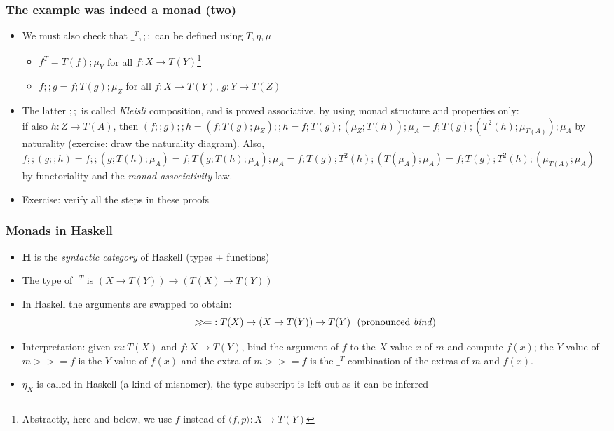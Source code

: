 \documentclass[handout]{beamer}
\newcommand{\bfsf}[1]{{\boldsymbol{#1}}}
\newcommand{\HH}{\bfsf{H}}
\newcommand{\Kp}[1]{{\langle #1 \rangle}}
\newcommand{\Kc}{;\!;}
\newcommand{\bind}{{>}\!\!{>}\!{=}}
\newcommand{\ttt}[1]{\text{\tt #1}}
\begin{document}
\frame
  {   
    \frametitle{The example was indeed a monad (two)}\label{Mon5:ExaMonadTwo}

 \begin{itemize}[<+->]
\item We must also check that $\_^T, \Kc$ can be defined using $T,\eta,\mu$
 \begin{itemize}
\item $f^T = T(f);\mu_Y$ for all $f: X\to T(Y)$\footnote{Abstractly, here and below,
we use $f$ instead of $\Kp{f,p}:X\to T(Y)$}
\item $f \Kc  g = f ;T(g);\mu_Z$ for all $f: X\to T(Y)$, $g: Y\to T(Z)$
 \end{itemize}
\item The latter $\Kc$ is called \emph{Kleisli} composition, and is proved
associative, by using monad structure and properties only:\\
if also $h: Z\to T(A)$, then
$(f \Kc g) \Kc h = (f ;T(g);\mu_Z) \Kc h = f ;T(g);(\mu_Z; T(h)) ; \mu_A =
f ;T(g);(T^2(h);\mu_{T(A)}) ; \mu_A$ by naturality (exercise: draw the naturality diagram). 
Also, $f \Kc (g \Kc h) = f \Kc (g;T(h);\mu_A) = f; T(g;T(h);\mu_A);\mu_A =
f; T(g);T^2(h);(T(\mu_A);\mu_A) = f; T(g);T^2(h);(\mu_{T(A)};\mu_A)$
by functoriality and the \emph{monad associativity} law.

\item Exercise: verify all the steps in these proofs
 \end{itemize}

 }

\frame
  {   
    \frametitle{Monads in Haskell}\label{Mon5:MonadHask}

 \begin{itemize}[<+->]
\item $\HH$ is the \emph{syntactic category} of Haskell (types + functions)
\item The type of $\_^T$ is $(X\to T(Y)) \to (T(X)\to T(Y))$
\item In Haskell the arguments are swapped to obtain:
$$\bind : T(X) \to (X\to T(Y)) \to T(Y)~~\text{(pronounced \emph{bind}})$$
\item Interpretation: given $m:T(X)$ and $f: X\to T(Y)$, %
bind the argument of $f$ to the $X$-value $x$ of $m$ and compute $f(x)$;
the $Y$-value of $m\bind f$ is the $Y$-value of $f(x)$ and
the extra of $m\bind f$ is the $\_^T$-combination of 
the extras of $m$ and $f(x)$.
\item $\eta_X$ is called \ttt{return} in Haskell (a kind of misnomer),
the type subscript is left out as it can be inferred


 \end{itemize}

 }
\end{document}
